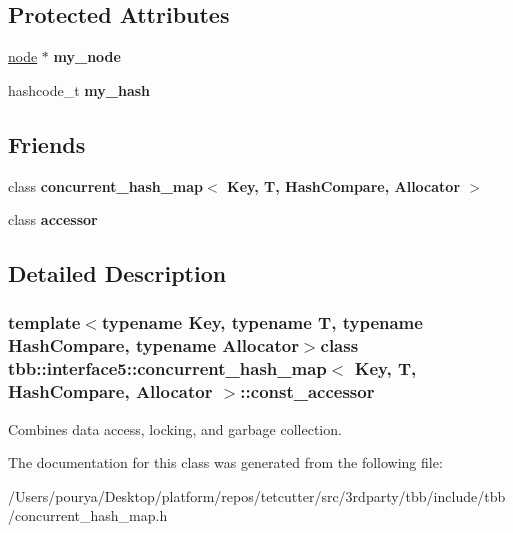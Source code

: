 \subsection*{Protected Attributes}
\begin{DoxyCompactItemize}
\item 
\hypertarget{classtbb_1_1interface5_1_1concurrent__hash__map_1_1const__accessor_ae645b3ae166a8f7934566a7ada4c71a1}{}\hyperlink{structtbb_1_1interface5_1_1concurrent__hash__map_1_1node}{node} $\ast$ {\bfseries my\+\_\+node}\label{classtbb_1_1interface5_1_1concurrent__hash__map_1_1const__accessor_ae645b3ae166a8f7934566a7ada4c71a1}

\item 
\hypertarget{classtbb_1_1interface5_1_1concurrent__hash__map_1_1const__accessor_a8fed02d1cf77fca2c52005bd3f902375}{}hashcode\+\_\+t {\bfseries my\+\_\+hash}\label{classtbb_1_1interface5_1_1concurrent__hash__map_1_1const__accessor_a8fed02d1cf77fca2c52005bd3f902375}

\end{DoxyCompactItemize}
\subsection*{Friends}
\begin{DoxyCompactItemize}
\item 
\hypertarget{classtbb_1_1interface5_1_1concurrent__hash__map_1_1const__accessor_a9a30829231c2a2f13cb12430992a0701}{}class {\bfseries concurrent\+\_\+hash\+\_\+map$<$ Key, T, Hash\+Compare, Allocator $>$}\label{classtbb_1_1interface5_1_1concurrent__hash__map_1_1const__accessor_a9a30829231c2a2f13cb12430992a0701}

\item 
\hypertarget{classtbb_1_1interface5_1_1concurrent__hash__map_1_1const__accessor_ab1dfccf6cc719ff15006a2b05cf70dd7}{}class {\bfseries accessor}\label{classtbb_1_1interface5_1_1concurrent__hash__map_1_1const__accessor_ab1dfccf6cc719ff15006a2b05cf70dd7}

\end{DoxyCompactItemize}


\subsection{Detailed Description}
\subsubsection*{template$<$typename Key, typename T, typename Hash\+Compare, typename Allocator$>$class tbb\+::interface5\+::concurrent\+\_\+hash\+\_\+map$<$ Key, T, Hash\+Compare, Allocator $>$\+::const\+\_\+accessor}

Combines data access, locking, and garbage collection. 

The documentation for this class was generated from the following file\+:\begin{DoxyCompactItemize}
\item 
/\+Users/pourya/\+Desktop/platform/repos/tetcutter/src/3rdparty/tbb/include/tbb/concurrent\+\_\+hash\+\_\+map.\+h\end{DoxyCompactItemize}
